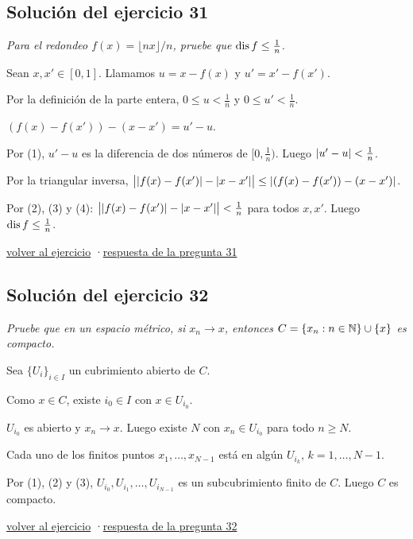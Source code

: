 \documentclass[11pt,a4paper]{article}
\providecommand{\lt}{<}\providecommand{\gt}{>}
\begin{document}
\subsection*{\hypertarget{s-31}{}Solución del ejercicio 31}
\emph{Para el redondeo $f(x)=\lfloor nx\rfloor/n$, pruebe que $\operatorname{dis} f\le\frac1n$.}
\begin{pasos}
\item[] Sean $x,x'\in[0,1]$. Llamamos $u=x-f(x)$ y $u'=x'-f(x')$.
\item[(1)] Por la definición de la parte entera, $0\le u\lt \frac1n$ y $0\le u'\lt \frac1n$.
\item[(2)] $(f(x)-f(x'))-(x-x')=u'-u$.
\item[(3)] Por (1), $u'-u$ es la diferencia de dos números de $[0,\frac1n)$. Luego $\abs{u'-u}\lt \frac1n$.
\item[(4)] Por la triangular inversa, $\bigl\lvert\lvert f(x)-f(x')\rvert-\lvert x-x'\rvert\bigr\rvert\le\lvert (f(x)-f(x'))-(x-x')\rvert$.
\item[] Por (2), (3) y (4): $\bigl\lvert\abs{f(x)-f(x')}-\abs{x-x'}\bigr\rvert\lt \frac1n$ para todos $x,x'$. Luego $\operatorname{dis} f\le\frac1n$.
\end{pasos}
\par{\small \hyperlink{x-31}{volver al ejercicio} \quad·\quad \hyperlink{r-31}{respuesta de la pregunta 31}}
\subsection*{\hypertarget{s-32}{}Solución del ejercicio 32}
\emph{Pruebe que en un espacio métrico, si $x_n\to x$, entonces $C=\{x_n:n\in\mathbb{N}\}\cup\{x\}$ es compacto.}
\begin{pasos}
\item[] Sea $\{U_i\}_{i\in I}$ un cubrimiento abierto de $C$.
\item[(1)] Como $x\in C$, existe $i_0\in I$ con $x\in U_{i_0}$.
\item[(2)] $U_{i_0}$ es abierto y $x_n\to x$. Luego existe $N$ con $x_n\in U_{i_0}$ para todo $n\ge N$.
\item[(3)] Cada uno de los finitos puntos $x_1,\dots,x_{N-1}$ está en algún $U_{i_k}$, $k=1,\dots,N-1$.
\item[] Por (1), (2) y (3), $U_{i_0},U_{i_1},\dots,U_{i_{N-1}}$ es un subcubrimiento finito de $C$. Luego $C$ es compacto.
\end{pasos}
\par{\small \hyperlink{x-32}{volver al ejercicio} \quad·\quad \hyperlink{r-32}{respuesta de la pregunta 32}}
\end{document}
